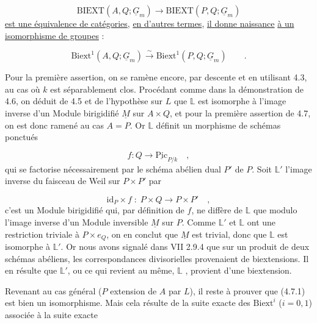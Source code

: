 \begin{equation*}
\mathrm{BIEXT}(A,Q;\underline{G}_m) \longrightarrow \mathrm{BIEXT}(P,Q;\underline{G}_m)
\end{equation*}
\underline{est une équivalence de catégories}, \underline{en d'autres termes}, \underline{il donne naissance} \underline{à un isomorphisme de groupes} :

\begin{equation}\tag{4.7.1}
\mathrm{Biext}^1(A,Q;\underline{G}_m) \stackrel{\sim}{\longrightarrow} \mathrm{Biext}^1(P,Q;\underline{G}_m) \qquad .
\end{equation}


Pour la première assertion, on se ramène encore, par descente et en utilisant 4.3, au cas où $k$ est séparablement clos. Procédant comme dans la démonstration de 4.6, on déduit de 4.5 et de l'hypothèse sur $L$ que $\mathbb{L}$ est isomorphe à l'image inverse d'un Module birigidifié $\underline{M}$ sur $A \times Q$, et pour la première assertion de 4.7, on est donc ramené au cas $A=P$. Or $\mathbb{L}$ définit un morphisme de schémas ponctués

\begin{equation*}
f:Q \longrightarrow \underline{\mathrm{Pic}}_{P/k} \quad ,
\end{equation*}
qui se factorise nécessairement par le schéma abélien dual $P'$ de $P$. Soit $\mathbb{L}'$ l'image inverse du faisceau de Weil sur $P \times P'$ par

\begin{equation*}
\mathrm{id}_P \times f \; : \; P \times Q \longrightarrow P \times P' \quad ,
\end{equation*}
c'est un Module birigidifié qui, par définition de $f$, ne diffère de $\mathbb{L}$ que modulo l'image inverse d'un Module inversible $\underline{M}$ sur $P$. Comme $\mathbb{L}'$ et $\mathbb{L}$ ont une restriction triviale à $P \times e_Q$, on en conclut que $\underline{M}$ est trivial, donc que $\mathbb{L}$ est isomorphe à $\mathbb{L}'$. Or nous avons signalé dans VII 2.9.4 que sur un produit de deux schémas abéliens, les correspondances divisorielles provenaient de biextensions. Il en résulte que $\mathbb{L}'$, ou ce qui revient au même, $\mathbb{L}$ , provient d'une biextension.

Revenant au cas général ($P$ extension de $A$ par $L$), il reste à prouver que (4.7.1) est bien un isomorphisme. Mais cela résulte de la suite exacte des $\mathrm{Biext}^i$ ($i=0,1$) associée à la suite exacte

